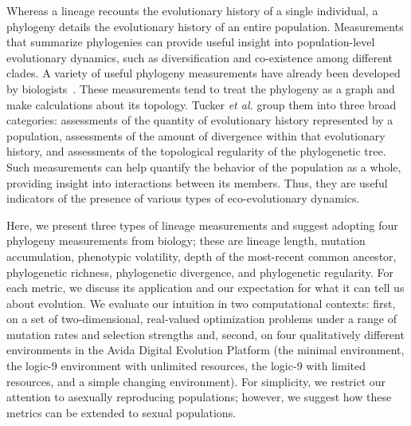 \documentclass[letterpaper]{article}
\begin{document}
Whereas a lineage recounts the evolutionary history of a single individual, a phylogeny details the evolutionary history of an entire population. Measurements that summarize phylogenies can provide useful insight into population-level evolutionary dynamics, such as diversification and co-existence among different clades. A variety of useful phylogeny measurements have already been developed by biologists~\citep{tucker_guide_2017}. These measurements tend to treat the phylogeny as a graph and make calculations about its topology. Tucker \textit{et al.} group them into three broad categories: assessments of the quantity of evolutionary history represented by a population, assessments of the amount of divergence within that evolutionary history, and assessments of the topological regularity of the phylogenetic tree. Such measurements can help quantify the behavior of the population as a whole, providing insight into interactions between its members. Thus, they are useful indicators of the presence of various types of eco-evolutionary dynamics.

Here, we present three types of lineage measurements and suggest adopting four phylogeny measurements from biology; these are lineage length, mutation accumulation, phenotypic volatility, depth of the most-recent common ancestor, phylogenetic richness, phylogenetic divergence, and phylogenetic regularity.
For each metric, we discuss its application and our expectation for what it can tell us about evolution. 
We evaluate our intuition in two computational contexts: first, on a set of two-dimensional, real-valued optimization problems under a range of mutation rates and selection strengths and, second, on four qualitatively different environments in the Avida Digital Evolution Platform 
(the minimal environment, the logic-9 environment with unlimited resources, the logic-9 with limited resources, and a simple changing environment).
For simplicity, we restrict our attention to asexually reproducing populations; however, we suggest how these metrics can be extended to sexual populations. 
\end{document}
